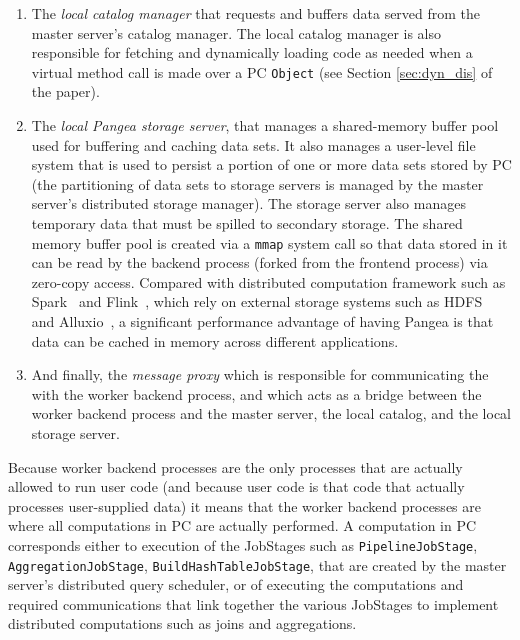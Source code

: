 \begin{enumerate}
\item The \emph{local catalog manager} that requests and 
buffers data served from the master server's catalog manager.  The local catalog manager is also responsible for fetching and dynamically loading
code as needed when a virtual method call is made over a PC \texttt{Object} (see Section \ref{sec:dyn_dis} of the paper).
\item The \emph{local Pangea storage server}, that manages a
  shared-memory buffer pool used for buffering and caching data sets.  It also manages
a  user-level file system that is used to persist a portion of one or more data sets stored by PC (the partitioning of data sets to storage servers is managed
by the master server's distributed storage manager).  The storage server also manages temporary data that must be spilled to secondary storage.
The shared memory buffer pool is created via a \texttt{mmap} system call so that
data stored in it can be read by the backend process (forked from
the frontend process) via zero-copy access. Compared with distributed
computation framework such as Spark~\cite{zaharia2010spark} and Flink~\cite{alexandrov2014stratosphere, carbone2015apache}, which rely on
external storage systems such as HDFS~\cite{borthakur2008hdfs} and Alluxio~\cite{li2014tachyon}, a significant
performance advantage of having Pangea is that data can be cached in memory
across different applications.
\item And finally, the \emph{message proxy} which is responsible for communicating the with the worker backend process, and which acts as a bridge between the
worker backend process and the master server, the local catalog, and the local storage server.

\end{enumerate}

Because worker backend processes are the only processes that are actually allowed to run user code (and because user code is that code that actually processes
user-supplied data) it means that the worker backend processes are
where all computations in PC are actually performed.  A computation in PC corresponds either
to execution of the 
JobStages such as \texttt{PipelineJobStage}, \texttt{AggregationJobStage},
\texttt{BuildHashTableJobStage}, that are created by the master server's distributed query scheduler, 
or of executing the computations and required communications
that link together the various JobStages to implement distributed computations such as joins and aggregations.  

